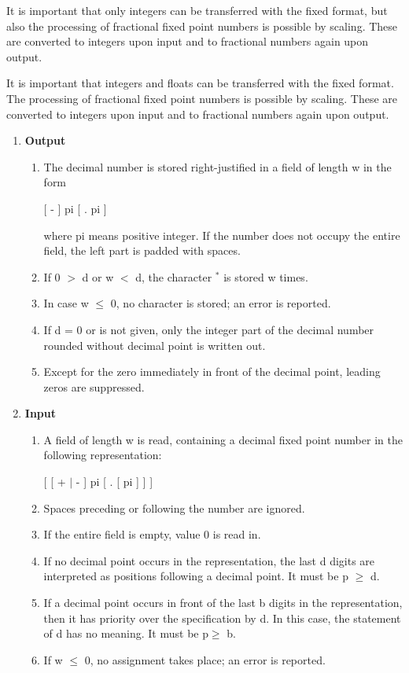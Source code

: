 \begin{removed}
It is important that only integers can be transferred with the fixed
format, but also the processing of fractional fixed point numbers is
possible by scaling. These are converted to integers upon input and to
fractional numbers again upon output.
\end{removed}

\begin{added}
It is important that 
 integers and floats can be transferred with the fixed
format. 
The processing of fractional fixed point numbers is
possible by scaling. These are converted to integers upon input and to
fractional numbers again upon output.
\end{added}

\begin{removed}
\begin{enumerate}
\item {\bf Output}
\begin{enumerate}
\item The decimal number is stored right-justified in a field of length
w in the form

[ - ] pi [ . pi ]

where pi means positive integer. If the number does not occupy the
entire field, the left part is padded with spaces.
\item If 0 $>$ d or w $<$ d, the character $^*$ is stored w times.
\item In case w $\leq$ 0, no character is stored; an error is reported.
\item If d = 0 or is not given, only the integer part of the decimal
number rounded without decimal point is written out.
\item Except for the zero immediately in front of the decimal point,
leading zeros are suppressed.
\end{enumerate}
\item {\bf Input}
\begin{enumerate}
\item A field of length w is read, containing a decimal fixed point
number in the following representation:

[ [ + $\mid$ - ] pi [ . [ pi ] ] ]

\item Spaces preceding or following the number are ignored.
\item If the entire field is empty, value 0 is read in.
\item If no decimal point occurs in the representation, the last d
digits are interpreted as positions following a decimal point. It must
be p $\geq$ d.
\item If a decimal point occurs in front of the last b digits in the
representation, then it has priority over the specification by d. In
this case, the statement of d has no meaning. It must be p$\geq$ b.
\item If w $\leq$ 0, no assignment takes place; an error is reported.
\end{enumerate}
\end{enumerate}


\end{removed}
